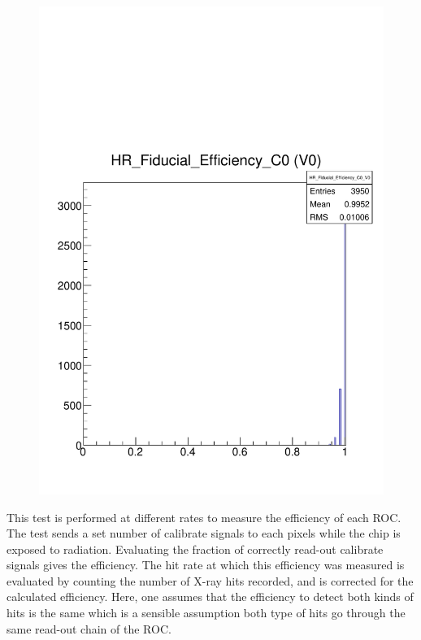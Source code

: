 \documentclass[a4paper,12pt,twoside]{article}
\begin{document}
\begin{figure} [h!]
\begin{minipage}{.48\textwidth}
  \includegraphics[width=\textwidth]{./Efficiency_Fiducial.pdf}
  \label{Efficiency-Fiducial}
\end{minipage}
\end{figure}

This test is performed at different rates to measure the efficiency of each ROC. The test sends a set number of calibrate signals to each pixels while the chip is exposed to radiation. Evaluating the fraction of correctly read-out calibrate signals gives the efficiency. The hit rate at which this efficiency was measured is evaluated by counting the number of X-ray hits recorded, and is corrected for the calculated efficiency. Here, one assumes that the efficiency to detect both kinds of hits is the same which is a sensible assumption both type of hits go through the same read-out chain of the ROC.
\end{document}
